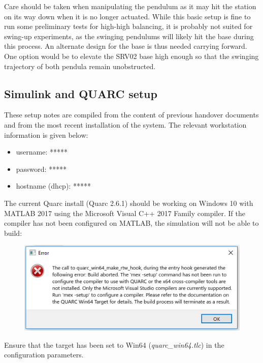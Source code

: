 \documentclass[12pt,letterpaper]{article}
\begin{document}
Care should be taken when manipulating the pendulum as it may hit the station on its way down when it is no longer actuated. While this basic setup is fine to run some preliminary tests for high-high balancing, it is probably not suited for swing-up experiments, as the swinging pendulums will likely hit the base during this process. An alternate design for the base is thus needed carrying forward. One option would be to elevate the SRV02 base high enough so that the swinging trajectory of both pendula remain unobstructed.

\subsection{Simulink and QUARC setup}

These setup notes are compiled from the content of previous handover documents and from the most recent installation of the system. The relevant workstation information is given below:

\begin{itemize}
    \item username: *****
    \item password: *****
    \item hostname (dhcp): *****
\end{itemize}

The current Quarc install (Quarc 2.6.1) should be working on Windows 10 with MATLAB 2017 using the Microsoft Visual C++ 2017 Family compiler. If the compiler has not been configured on MATLAB, the simulation will not be able to build:

\begin{figure}[H]
\centering
\includegraphics[width=\linewidth]{img/error.png}
\label{fig:error}
\end{figure}

Ensure that the target has been set to Win64 (\textit{quarc\_win64.tlc}) in the configuration parameters.
\end{document}
